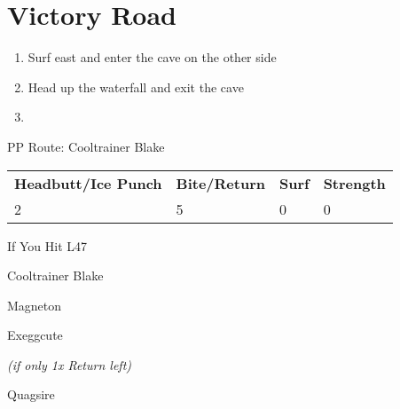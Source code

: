 \chapter{Victory Road}
\vspace{0.5mm}

\begin{paracol}{2}
\begin{enumerate}
	\item Surf east and enter the cave on the other side
	\item Head up the waterfall and exit the cave 
	\item {}
\end{enumerate}

\switchcolumn*
\alignBoxes
\begin{misc}{PP Route: Cooltrainer Blake}
	\varwb
	\begin{tabu} to \textwidth {X[6,c] X[5,c] X[4,c] X[4,c]}
		\textbf{Headbutt/Ice Punch} & \textbf{Bite/Return} & \textbf{Surf} & \textbf{Strength}\\ 
		2 & 5 & 0 & 0
	\end{tabu}
	\varwe
\end{misc}

\begin{misc}{If You Hit L47}
	\varwb
	\begin{notes}
		\item {}
	\end{notes}
	\varwe
\end{misc}

\switchcolumn
\begin{trainer}{Cooltrainer Blake}
	\varwb
	\begin{fightSection}{Magneton}
		\item {} \surf
	\end{fightSection}
	\begin{fightSection}{Exeggcute}
		\item {} \return
		\begin{notes}
			\small{\item {} \icePunch{} \textit{(if only 1x Return left)}}
		\end{notes}
	\end{fightSection}
	\begin{fightSection}{Quagsire}
		\item {} \surf
	\end{fightSection}
	\varwe
\end{trainer}


\end{paracol}
